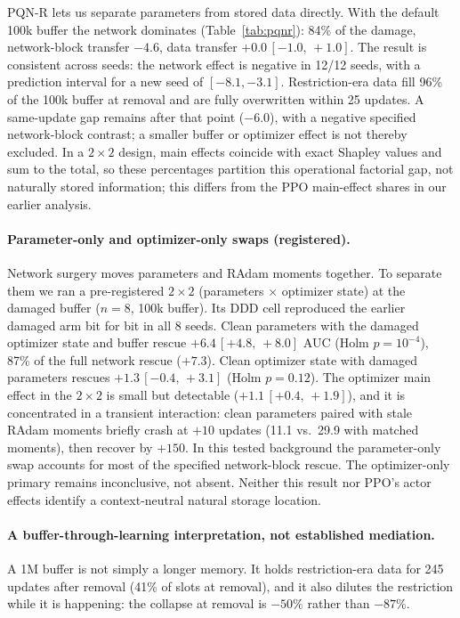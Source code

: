 \documentclass[10pt]{article} %
\newcommand{\ci}[2]{\,[#1,\,#2]}
\begin{document}
PQN-R lets us separate parameters from stored data directly. With the default 100k buffer the network dominates (Table~\ref{tab:pqnr}): 84\% of the damage, network-block transfer $-4.6$, data transfer $+0.0\ci{-1.0}{+1.0}$. The result is consistent across seeds: the network effect is negative in 12/12 seeds, with a prediction interval for a new seed of $[-8.1,-3.1]$. Restriction-era data fill 96\% of the 100k buffer at removal and are fully overwritten within 25 updates. A same-update gap remains after that point ($-6.0$), with a negative specified network-block contrast; a smaller buffer or optimizer effect is not thereby excluded. In a $2\times2$ design, main effects coincide with exact Shapley values and sum to the total, so these percentages partition this operational factorial gap, not naturally stored information; this differs from the PPO main-effect shares in our earlier analysis.

\paragraph{Parameter-only and optimizer-only swaps (registered).}
Network surgery moves parameters and RAdam moments together. To separate them we ran a pre-registered $2\times2$ (parameters $\times$ optimizer state) at the damaged buffer ($n=8$, 100k buffer). Its DDD cell reproduced the earlier damaged arm bit for bit in all 8 seeds. Clean parameters with the damaged optimizer state and buffer rescue $+6.4\ci{+4.8}{+8.0}$ AUC (Holm $p=10^{-4}$), 87\% of the full network rescue ($+7.3$). Clean optimizer state with damaged parameters rescues $+1.3\ci{-0.4}{+3.1}$ (Holm $p=0.12$). The optimizer main effect in the $2\times2$ is small but detectable ($+1.1\ci{+0.4}{+1.9}$), and it is concentrated in a transient interaction: clean parameters paired with stale RAdam moments briefly crash at $+10$ updates (11.1 vs.\ 29.9 with matched moments), then recover by $+150$. In this tested background the parameter-only swap accounts for most of the specified network-block rescue. The optimizer-only primary remains inconclusive, not absent. Neither this result nor PPO's actor effects identify a context-neutral natural storage location.

\paragraph{A buffer-through-learning interpretation, not established mediation.}
A 1M buffer is not simply a longer memory. It holds restriction-era data for 245 updates after removal (41\% of slots at removal), and it also dilutes the restriction while it is happening: the collapse at removal is $-50\%$ rather than $-87\%$.
\end{document}
